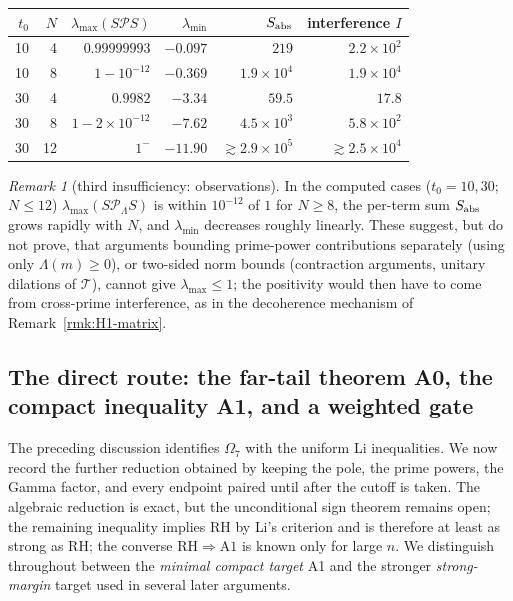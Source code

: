 \documentclass[11pt]{amsart}
\theoremstyle{definition}
\theoremstyle{remark}
\newtheorem{remark}[theorem]{Remark}
\theoremstyle{definition}
\newcommand{\RH}{\mathrm{RH}}
\begin{document}
\begin{center}\small
\begin{tabular}{rr|rrrr}
$t_0$ & $N$ & $\lambda_{\max}(S\mathcal P S)$ & $\lambda_{\min}$ & $S_{\rm abs}$ & interference $I$ \\\hline
10 & 4 & $0.99999993$ & $-0.097$ & $219$ & $2.2\times10^2$\\
10 & 8 & $1-10^{-12}$ & $-0.369$ & $1.9\times10^4$ & $1.9\times10^4$\\
30 & 4 & $0.9982$ & $-3.34$ & $59.5$ & $17.8$\\
30 & 8 & $1-2\times10^{-12}$ & $-7.62$ & $4.5\times10^3$ & $5.8\times10^2$\\
30 & 12 & $1^{-}$ & $-11.90$ & $\gtrsim2.9\times10^5$ & $\gtrsim2.5\times10^4$\\
\end{tabular}
\end{center}

\begin{remark}[third insufficiency: observations]\label{rmk:whitened-interference}
In the computed cases ($t_0=10,30$; $N\le12$) $\lambda_{\max}(S\mathcal P_\Lambda S)$ is within
$10^{-12}$ of $1$ for $N\ge8$, the per-term sum $S_{\rm abs}$ grows rapidly with $N$, and
$\lambda_{\min}$ decreases roughly linearly.  These suggest, but do not prove, that arguments bounding
prime-power contributions separately (using only $\Lambda(m)\ge0$), or two-sided norm bounds
(contraction arguments, unitary dilations of $\mathcal T$), cannot give $\lambda_{\max}\le1$; the
positivity would then have to come from cross-prime interference, as in the decoherence mechanism of
Remark~\ref{rmk:H1-matrix}.
\end{remark}



\subsection{The direct route: the far-tail theorem A0, the compact inequality A1, and a weighted gate}
\label{subsec:omega7-a0a1}

The preceding discussion identifies $\Omega_7$ with the uniform Li inequalities.  We now record the
further reduction obtained by keeping the pole, the prime powers, the Gamma factor, and every endpoint
paired until after the cutoff is taken.  The algebraic reduction is exact, but the unconditional sign
theorem remains open; the remaining inequality implies RH by Li's criterion and is therefore at least as strong as RH; the converse $\RH\Rightarrow\mathrm{A1}$ is known only for large $n$.  We distinguish throughout between the \emph{minimal compact target} A1 and the stronger
\emph{strong-margin} target used in several later arguments.
\end{document}

